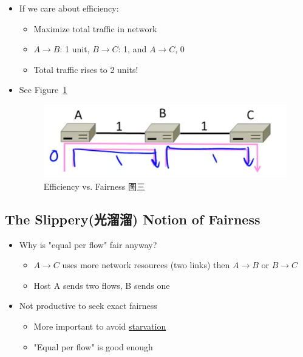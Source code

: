 \documentclass[12pt]{ctexart}   %
\begin{document}
\begin{itemize}
		 \item If we care about efficiency:
		 \begin{itemize}
		 	\item Maximize total traffic in network
		 	\item $A \rightarrow B$: 1 unit, $B \rightarrow C$: 1, and $A \rightarrow C$, 0
		 	\item Total traffic rises to 2 units!
		 \end{itemize}
		 \item See Figure~\ref{fig:7-2-3}
		  
		 \begin{figure}[h!] %
		\centering
		 \includegraphics[scale=0.7]{images/7-2-3}
		\caption{ Efficiency vs. Fairness 图三}
		 \label{fig:7-2-3}
		 \end{figure}
		 
	\end{itemize}
	
	\subsection{The Slippery(光溜溜) Notion of Fairness}
	\begin{itemize}
		\item Why is "equal per flow" fair anyway?
		\begin{itemize}
			\item $A \rightarrow C$ uses more network resources (two links) then $A \rightarrow B$ or $B \rightarrow C$
			\item Host A sends two flows, B sends one
		\end{itemize}
		
		\item Not productive to seek exact fairness
		\begin{itemize}
			\item More important to avoid \underline{starvation}
			\item "Equal per flow" is good enough
		\end{itemize}
	\end{itemize}
	
\end{document}
